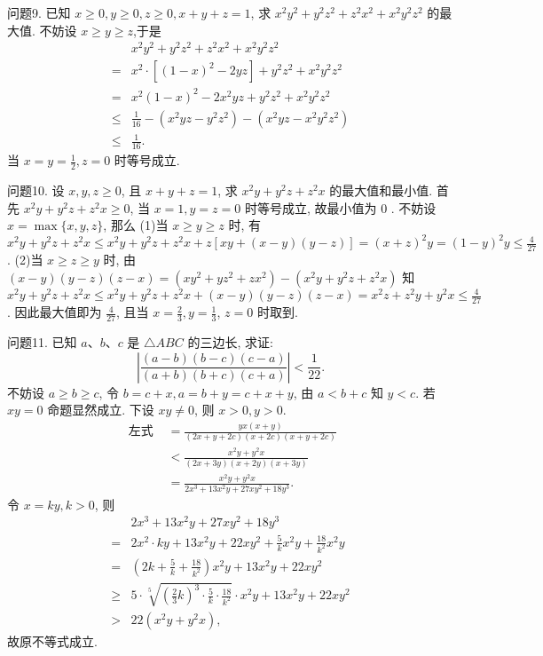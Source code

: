 问题9. 已知 $x \geqslant 0, y \geqslant 0, z \geqslant 0, x+y+z=1$, 求 $x^2 y^2+y^2 z^2+z^2 x^2+x^2 y^2 z^2$ 的最大值.
不妨设 $x \geqslant y \geqslant z$,于是
$$
\begin{aligned}
& x^2 y^2+y^2 z^2+z^2 x^2+x^2 y^2 z^2 \\
= & x^2 \cdot\left[(1-x)^2-2 y z\right]+y^2 z^2+x^2 y^2 z^2 \\
= & x^2(1-x)^2-2 x^2 y z+y^2 z^2+x^2 y^2 z^2 \\
\leqslant & \frac{1}{16}-\left(x^2 y z-y^2 z^2\right)-\left(x^2 y z-x^2 y^2 z^2\right) \\
\leqslant & \frac{1}{16} .
\end{aligned}
$$
当 $x=y=\frac{1}{2}, z=0$ 时等号成立.



问题10. 设 $x, y, z \geqslant 0$, 且 $x+y+z=1$, 求 $x^2 y+y^2 z+z^2 x$ 的最大值和最小值.
首先 $x^2 y+y^2 z+z^2 x \geqslant 0$, 当 $x=1, y=z=0$ 时等号成立, 故最小值为 0 . 不妨设 $x=\max \{x, y, z\}$, 那么
(1)当 $x \geqslant y \geqslant z$ 时, 有 $x^2 y+y^2 z+z^2 x \leqslant x^2 y+y^2 z+z^2 x+z[x y+(x-y)(y-z)]=(x+z)^2 y=(1-y)^2 y \leqslant \frac{4}{27}$.
(2)当 $x \geqslant z \geqslant y$ 时, 由 $(x-y)(y-z)(z-x)=\left(x y^2+y z^2+z x^2\right)- \left(x^2 y+y^2 z+z^2 x\right)$ 知 $x^2 y+y^2 z+z^2 x \leqslant x^2 y+y^2 z+z^2 x+(x-y)(y-z) (z-x)=x^2 z+z^2 y+y^2 x \leqslant \frac{4}{27}$. 因此最大值即为 $\frac{4}{27}$, 且当 $x=\frac{2}{3}, y=\frac{1}{3}$, $z=0$ 时取到.



问题11. 已知 $a 、 b 、 c$ 是 $\triangle A B C$ 的三边长, 求证:
$$
\left|\frac{(a-b)(b-c)(c-a)}{(a+b)(b+c)(c+a)}\right|<\frac{1}{22} .
$$
不妨设 $a \geqslant b \geqslant c$, 令 $b=c+x, a=b+y=c+x+y$, 由 $a<b+ c$ 知 $y<c$. 若 $x y=0$ 命题显然成立.
下设 $x y \neq 0$, 则 $x>0, y>0$.
$$
\begin{aligned}
\text { 左式 } & =\frac{y x(x+y)}{(2 x+y+2 c)(x+2 c)(x+y+2 c)} \\
& <\frac{x^2 y+y^2 x}{(2 x+3 y)(x+2 y)(x+3 y)} \\
& =\frac{x^2 y+y^2 x}{2 x^3+13 x^2 y+27 x y^2+18 y^3} .
\end{aligned}
$$
令 $x=k y, k>0$, 则
$$
\begin{aligned}
& 2 x^3+13 x^2 y+27 x y^2+18 y^3 \\
= & 2 x^2 \cdot k y+13 x^2 y+22 x y^2+\frac{5}{k} x^2 y+\frac{18}{k^2} x^2 y \\
= & \left(2 k+\frac{5}{k}+\frac{18}{k^2}\right) x^2 y+13 x^2 y+22 x y^2 \\
\geqslant & 5 \cdot \sqrt[5]{\left(\frac{2}{3} k\right)^3 \cdot \frac{5}{k} \cdot \frac{18}{k^2}} \cdot x^2 y+13 x^2 y+22 x y^2 \\
> & 22\left(x^2 y+y^2 x\right),
\end{aligned}
$$
故原不等式成立.



